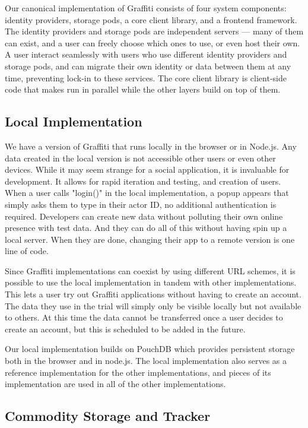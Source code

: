 Our canonical implementation of Graffiti consists of four system components:
identity providers, storage pods, a core client library, and a frontend framework.
The identity providers and storage pods are independent servers
--- many of them can exist, and a user can freely choose which ones to use, or even host their own.
A user interact seamlessly with users who use different identity providers and storage pods,
and can migrate their own identity or data between them at any time, preventing lock-in to these services.
The core client library is client-side code that makes
run in parallel while the other
layers build on top of them.

\subsection{Local Implementation}

We have a version of Graffiti that runs locally in the browser or in Node.js.
Any data created in the local version is not accessible other users or even other devices.
While it may seem strange for a social application, it is invaluable for development.
It allows for rapid iteration and testing, and creation of users.
When a user calls "login()" in the local implementation, a popup appears that
simply asks them to type in their actor ID, no additional authentication is required.
Developers can create new data without polluting their own online presence with test data.
And they can do all of this without having spin up a local server.
When they are done, changing their app to a remote version is one line of code.

Since Graffiti implementations can coexist by using different URL schemes,
it is possible to use the local implementation in tandem with other implementations.
This lets a user try out Graffiti applications without having to create an
account. The data they use in the trial will simply only be visible locally but
not available to others. At this time the data cannot be transferred once
a user decides to create an account, but this is scheduled to be added in the future.

Our local implementation builds on PouchDB which provides persistent
storage both in the browser and in node.js.
The local implementation also serves as a reference implementation for the other implementations,
and pieces of its implementation are used in all of the other implementations.

\subsection{Commodity Storage and Tracker}

